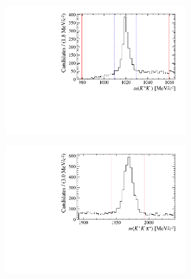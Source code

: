 \begin{figure}[!h]
   \centering
   \begin{subfigure}[t]{1.0\textwidth}
   \centering
     \begin{subfigure}[t]{0.35\textwidth}
        \centering
        \includegraphics[width=1.0\textwidth]{figs/Selection/Phimass_KKPi_B2DsPhi.pdf}
     \end{subfigure}
     \begin{subfigure}[t]{0.35\textwidth}
        \centering
        \includegraphics[width=1.0\textwidth]{figs/Selection/Dmass_KKPi_B2DsPhi.pdf}
     \end{subfigure}
     \caption{\decay{\Bp}{(\decay{\Dsp}{\Kp\Km\pip})\phiz}}
   \end{subfigure}   

\end{figure}
